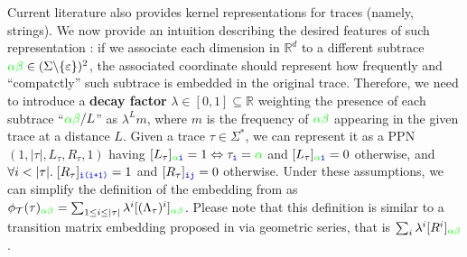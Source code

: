 Current literature also provides kernel representations for traces (namely, strings). We now provide an intuition describing the desired features of such representation \cite{LodhiSSCW02}: if we associate each dimension in $\mathbb{R}^d$ to a different subtrace ${\color{green}\alpha\beta}\in(\Sigma\backslash\{\varepsilon\})^2$, the associated coordinate should represent how frequently and ``compatctly'' such subtrace is embedded in the original trace. Therefore, we need to introduce a \textbf{decay factor} $\lambda\in[0,1]\subseteq\mathbb{R}$ weighting the presence of each subtrace ``${\color{green}\alpha\beta}/L$'' as $\lambda^Lm$, where $m$ is the frequency of $\color{green}\alpha\beta$ appearing in the given trace at a distance $L$. Given a trace $\tau\in\Sigma^*$, we can represent it as a PPN \cite{Myers1989} $(1,{|\tau|},L_\tau,R_\tau,1)$ having $[L_\tau]_{{\color{green}\alpha}\texttt{\color{blue}i}}=1\Leftrightarrow \tau_{\texttt{\color{blue}i}}={\color{green}\alpha}$ and $[L_\tau]_{{\color{green}\alpha}\texttt{\color{blue}i}}=0$ otherwise, and $\forall i<|\tau|.\; [R_\tau]_{\texttt{\color{blue}i(i+1)}}=1 $ and $[R_\tau]_{\texttt{\color{blue}ij}}=0$ otherwise. Under these assumptions, we can simplify the definition of the embedding from \cite{LodhiSSCW02,Raedt} as $\phi_{\mathcal{T}}(\tau)_{{\color{green}\alpha\beta}}=\sum_{1\leq i\leq |\tau|}\lambda^i[(\Lambda_\tau)^i]_{\color{green}\alpha\beta}$. Please note that this definition is similar to a transition matrix embedding proposed in \cite{GartnerFW03} via geometric series, that is $\sum_i\lambda^i[R^i]_{\color{green}\alpha\beta}$. 


